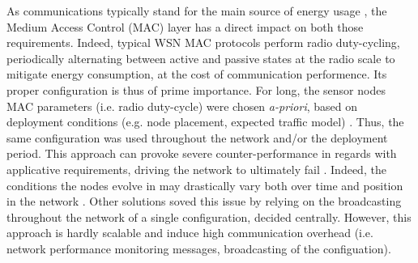 \documentclass[12pt,journal,compsoc]{IEEEtran}
\begin{document}
As communications typically stand for the main source of energy usage \cite{ass02wireless}, the Medium Access Control (MAC) layer has a direct impact on both those requirements. Indeed, typical WSN MAC protocols perform radio duty-cycling, periodically alternating between active and passive states at the radio scale to mitigate energy consumption, at the cost of communication performence. Its proper configuration is thus of prime importance.
For long, the sensor nodes MAC parameters (i.e. radio duty-cycle) were chosen \textit{a-priori}, based on deployment conditions (e.g. node placement, expected traffic model) \cite{dem10evolution, sensorscope10}. Thus, the same configuration was used throughout the network and/or the deployment period. This approach can provoke severe counter-performance in regards with applicative requirements, driving the network to ultimately fail \cite{sensorscope10, murphypotatoes06}. Indeed, the conditions the nodes evolve in may drastically vary both over time and position in the network \cite{linkstability12, addvalue13, tempimpact10}. Other solutions soved this issue by relying on the broadcasting throughout the network of a single configuration, decided centrally. However, this approach is hardly scalable and induce high communication overhead (i.e. network performance monitoring messages, broadcasting of the configuation).








\end{document}
